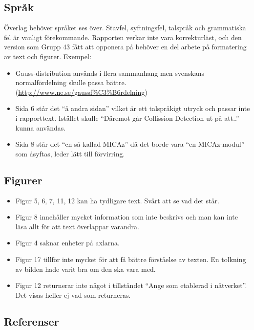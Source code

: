 \documentclass[a4paper,11pt]{article}
\begin{document}
\subsection{Språk}

Överlag behöver språket ses över. Stavfel, syftningsfel, talspråk och grammatiska fel är vanligt förekommande. Rapporten verkar inte vara korrekturläst, och den version som Grupp 43 fått att opponera på behöver en del arbete på formatering av text och figurer. Exempel:

\begin{itemize}
   \item Gauss-distribution används i flera sammanhang men svenskans normalfördelning skulle passa bättre. (\url{http://www.ne.se/gaussf\%C3\%B6rdelning})
   \item Sida 6 står det “å andra sidan” vilket är ett talspråkigt utryck och passar inte i rapporttext. Istället skulle “Däremot går Collission Detection ut på att..” kunna användas.
   \item Sida 8 står det “en så kallad MICAz” då det borde vara “en MICAz-modul” som åsyftas, leder lätt till förvirring.
\end{itemize}

\subsection{Figurer}

\begin{itemize}
   \item Figur 5, 6, 7, 11, 12 kan ha tydligare text. Svårt att se vad det står.
   \item Figur 8 innehåller mycket information som inte beskrivs och man kan inte läsa allt för att text överlappar varandra.
   \item Figur 4 saknar enheter på axlarna.
   \item Figur 17 tillför inte mycket för att få bättre förståelse av texten. En tolkning av bilden hade varit bra om den ska vara med.
   \item Figur 12 returnerar inte något i tillståndet “Ange som etablerad i nätverket”. Det visas heller ej vad som returneras.
\end{itemize}

\subsection{Referenser}
\end{document}
